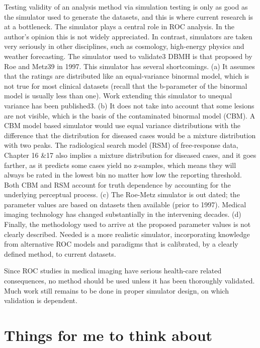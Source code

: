 \documentclass[
]{book}
\begin{document}
Testing validity of an analysis method via simulation testing is only as good as the simulator used to generate the datasets, and this is where current research is at a bottleneck. The simulator plays a central role in ROC analysis. In the author's opinion this is not widely appreciated. In contrast, simulators are taken very seriously in other disciplines, such as cosmology, high-energy physics and weather forecasting. The simulator used to validate3 DBMH is that proposed by Roe and Metz39 in 1997. This simulator has several shortcomings. (a) It assumes that the ratings are distributed like an equal-variance binormal model, which is not true for most clinical datasets (recall that the b-parameter of the binormal model is usually less than one). Work extending this simulator to unequal variance has been published3. (b) It does not take into account that some lesions are not visible, which is the basis of the contaminated binormal model (CBM). A CBM model based simulator would use equal variance distributions with the difference that the distribution for diseased cases would be a mixture distribution with two peaks. The radiological search model (RSM) of free-response data, Chapter 16 \&17 also implies a mixture distribution for diseased cases, and it goes farther, as it predicts some cases yield no z-samples, which means they will always be rated in the lowest bin no matter how low the reporting threshold. Both CBM and RSM account for truth dependence by accounting for the underlying perceptual process. (c) The Roe-Metz simulator is out dated; the parameter values are based on datasets then available (prior to 1997). Medical imaging technology has changed substantially in the intervening decades. (d) Finally, the methodology used to arrive at the proposed parameter values is not clearly described. Needed is a more realistic simulator, incorporating knowledge from alternative ROC models and paradigms that is calibrated, by a clearly defined method, to current datasets.

Since ROC studies in medical imaging have serious health-care related consequences, no method should be used unless it has been thoroughly validated. Much work still remains to be done in proper simulator design, on which validation is dependent.

\hypertarget{things-for-me-to-think-about}{%
\section{Things for me to think about}\label{things-for-me-to-think-about}}
\end{document}
